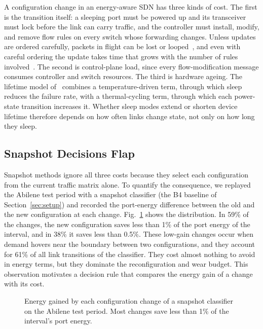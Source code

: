 \documentclass[journal]{IEEEtran}
\begin{document}
A configuration change in an energy-aware SDN has three kinds of cost. The first is the transition itself: a sleeping port must be powered up and its transceiver must lock before the link can carry traffic, and the controller must install, modify, and remove flow rules on every switch whose forwarding changes. Unless updates are ordered carefully, packets in flight can be lost or looped~\cite{reitblatt2012abstractions}, and even with careful ordering the update takes time that grows with the number of rules involved~\cite{jin2014dionysus}. The second is control-plane load, since every flow-modification message consumes controller and switch resources. The third is hardware ageing. The lifetime model of~\cite{chiaraviglio2015lifetime} combines a temperature-driven term, through which sleep reduces the failure rate, with a thermal-cycling term, through which each power-state transition increases it. Whether sleep modes extend or shorten device lifetime therefore depends on how often links change state, not only on how long they sleep.

\subsection{Snapshot Decisions Flap}

Snapshot methods ignore all three costs because they select each configuration from the current traffic matrix alone. To quantify the consequence, we replayed the Abilene test period with a snapshot classifier (the B4 baseline of Section~\ref{sec:setup}) and recorded the port-energy difference between the old and the new configuration at each change. Fig.~\ref{fig:motivation} shows the distribution. In 59\% of the changes, the new configuration saves less than 1\% of the port energy of the interval, and in 38\% it saves less than 0.5\%. These low-gain changes occur when demand hovers near the boundary between two configurations, and they account for 61\% of all link transitions of the classifier. They cost almost nothing to avoid in energy terms, but they dominate the reconfiguration and wear budget. This observation motivates a decision rule that compares the energy gain of a change with its cost.

\begin{figure}[t]
\centering
{}
\caption{Energy gained by each configuration change of a snapshot classifier on the Abilene test period. Most changes save less than 1\% of the interval's port energy.}
\label{fig:motivation}
\end{figure}
\end{document}
